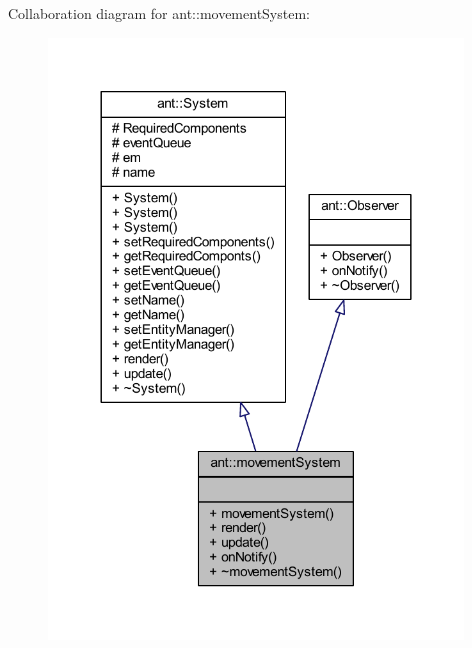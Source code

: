 Collaboration diagram for ant\+:\+:movement\+System\+:
\nopagebreak
\begin{figure}[H]
\begin{center}
\leavevmode
\includegraphics[width=312pt]{d2/dff/classant_1_1movement_system__coll__graph}
\end{center}
\end{figure}
